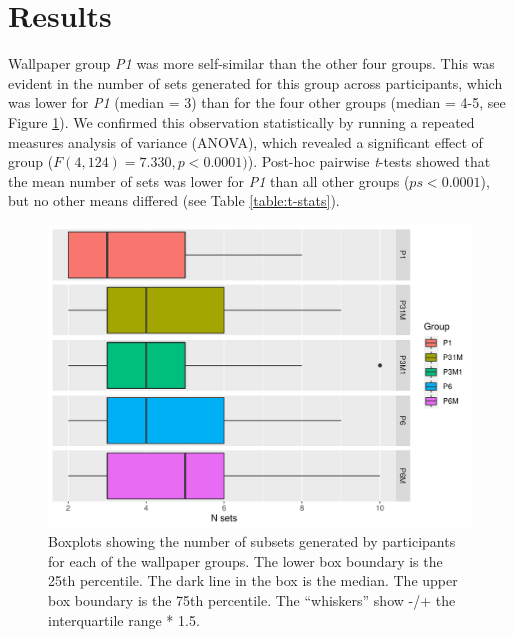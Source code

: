 \documentclass[11pt, twoside]{article}
\begin{document}
\section*{Results}
Wallpaper group \textit{P1} was more self-similar than the other four groups. This was evident in the number of sets generated for this group across participants, which was lower for \textit{P1} (median = 3) than for the four other groups (median = 4-5, see Figure \ref{fig:n_sets_summary}). We confirmed this observation statistically by running a repeated measures analysis of variance (ANOVA), which revealed a significant effect of group ($F(4, 124) = 7.330, p < 0.0001)$). Post-hoc pairwise \textit{t}-tests showed that the mean number of sets was lower for \textit{P1} than all other groups ($ps < 0.0001$), but no other means differed (see Table \ref{table:t-stats}).
\begin{figure}[t]
	\centering
	\includegraphics[width=\linewidth]{./figures/nsets_summary.pdf}
	\caption{Boxplots showing the number of subsets generated by participants for each of the wallpaper groups. The lower box boundary is the 25th percentile. The dark line in the box is the median. The upper box boundary is the 75th percentile. The “whiskers” show -/+ the interquartile range * 1.5.}
	\label{fig:n_sets_summary}
\end{figure}
\end{document}
